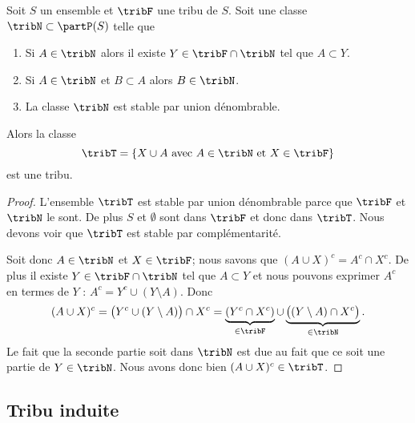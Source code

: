 \begin{proposition}  \label{PropHYLooLgOCy}
    Soit \( S\) un ensemble et \( \tribF\) une tribu de \( S\). Soit une classe \( \tribN\subset\partP(S)\) telle que
    \begin{enumerate}
        \item
            Si \( A\in\tribN\) alors il existe \( Y\in\tribF\cap\tribN\) tel que \( A\subset Y\).
        \item
            Si \( A\in\tribN\) et \( B\subset A\) alors \( B\in\tribN\).
        \item
            La classe \( \tribN\) est stable par union dénombrable.
    \end{enumerate}
    Alors la classe
    \begin{equation}
        \tribT=\{ X\cup A\text{ avec } A\in\tribN\text{ et } X\in\tribF \}
    \end{equation}
    est une tribu.
\end{proposition}

\begin{proof}
    L'ensemble \( \tribT\) est stable par union dénombrable parce que \( \tribF\) et \( \tribN\) le sont. De plus \( S\) et \( \emptyset\) sont dans \( \tribF\) et donc dans \( \tribT\). Nous devons voir que \( \tribT\) est stable par complémentarité.

    Soit donc \( A\in\tribN\) et \( X\in\tribF\); nous savons que \( (A\cup X)^c=A^c\cap X^c\). De plus il existe \( Y\in\tribF\cap\tribN\) tel que \( A\subset Y\) et nous pouvons exprimer \( A^c\) en termes de \( Y\) : \( A^c=Y^c\cup(Y\setminus A)\). Donc
    \begin{equation}
        (A\cup X)^c=\big( Y^c\cup(Y\setminus A) \big)\cap X^c=\underbrace{(Y^c\cap X^c)}_{\in\tribF}\cup\underbrace{\big( (Y\setminus A)\cap X^c \big)}_{\in\tribN}.
    \end{equation}
    Le fait que la seconde partie soit dans \( \tribN\) est due au fait que ce soit une partie de \( Y\in\tribN\). Nous avons donc bien \( (A\cup X)^c\in\tribT\).
\end{proof}

\subsection{Tribu induite}

